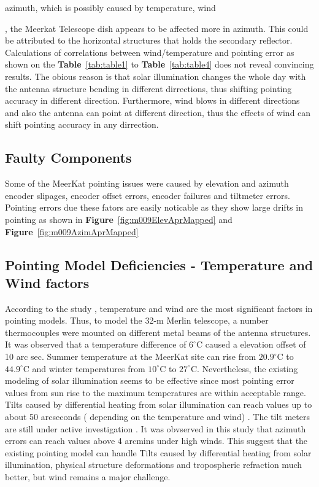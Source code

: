 \documentclass{article}
\begin{document}
azimuth, which is possibly caused by temperature, wind {\cite{kong}, the Meerkat Telescope dish appears to be affected more in azimuth.   This could be attributed to the horizontal structures that holds the secondary reflector.  \\
	
	Calculations of correlations between wind/temperature and pointing error as shown on the \textbf{Table}~\ref{tab:table1} to \textbf{Table}~\ref{tab:table4} does not reveal convincing results.   The obious  reason is that solar illumination changes the whole day with the antenna structure bending in different dirrections, thus shifting pointing accuracy in different direction.  Furthermore, wind blows in different directions and also the antenna can point at different direction, thus the effects of wind can shift pointing accuracy in any dirrection.  
	
	
	\subsection{Faulty Components}
	Some of the MeerKat pointing issues were  caused by elevation and azimuth encoder slipages, encoder offset errors, encoder failures and tiltmeter errors.  Pointing errors due these fators are easily noticable as they show large drifts in pointing as shown in \textbf{Figure}~\ref{fig:m009ElevAprMapped} and \textbf{Figure}~\ref{fig:m009AzimAprMapped} 
	
	\subsection{Pointing Model Deficiencies - Temperature and Wind factors}
	
	According to the study \cite{Bayley}, temperature and wind are the most significant factors in pointing models.  Thus, to model the 32-m Merlin telescope, a number thermocouples were mounted on different metal beams of the antenna structures.  It was observed that a temperature difference of $6^\circ$C  caused a elevation offset of 10 arc sec.  Summer temperature at the MeerKat site can rise from $20.9^\circ$C to $44.9^\circ$C and winter temperatures from $10^\circ$C to $27^\circ$C. Nevertheless, the existing modeling of solar illumination seems to be effective since most pointing error values from sun rise to the maximum temperatures are within acceptable range.\\
	
	
	
	Tilts caused by differential heating from solar illumination can reach values up to about 50 arcseconds ( depending on the temperature and wind) \cite{Tony}.  The tilt meters are still under active investigation  \cite{SE}.  It was obvserved in this study that azimuth errors can reach values above 4 arcmins under high winds.  This suggest that the existing pointing model can handle Tilts caused by differential heating from solar illumination, physical structure deformations and tropospheric refraction much better, but wind remains a major challenge. 
	
}
\end{document}
